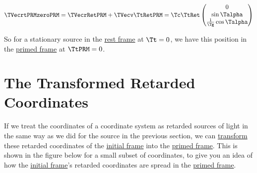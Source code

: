 \begin{equation}
	\label{eq: primed position with synced times}
	\TVecrtPRMzeroPRM  = \TVecrRetPRM  + \TVecv \TtRetPRM  = {\Tc }{ \TtRet  }
	\begin{pmatrix}
		0                               \\
		\sin{\Talpha }                    \\
		\frac{1}{ \Tg  } \cos{\Talpha } \\
	\end{pmatrix}
\end{equation}

So for a stationary source in the \hyperlink{def-proper-frame}{rest frame} at $\Tt =0$, we have this position in the \hyperlink{def-Primed-Frame}{primed frame} at $\TtPRM =0$.

\section{The Transformed Retarded Coordinates} \label{sect: Delayed View of Transformed Coordinates}

If we treat the coordinates of a coordinate system as retarded sources of light in the same way as we did for the source in the previous section, we can \hyperlink{def-transform}{transform} these retarded coordinates of the \hyperlink{def-initial-Frame}{initial frame} into the \hyperlink{def-Primed-Frame}{primed frame}.
This is shown in the figure below for a small subset of coordinates, to give you an idea of how the \hyperlink{def-initial-Frame}{initial frame}'s retarded coordinates are spread in the \hyperlink{def-Primed-Frame}{primed frame}.


